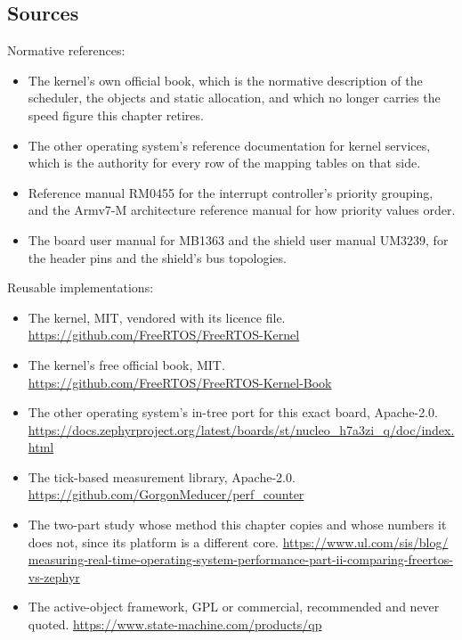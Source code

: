 \subsection*{Sources}

Normative references:
\begin{itemize}
\item The kernel's own official book, which is the normative description of the
scheduler, the objects and static allocation, and which no longer carries the
speed figure this chapter retires.
\item The other operating system's reference documentation for kernel services,
which is the authority for every row of the mapping tables on that side.
\item Reference manual RM0455 for the interrupt controller's priority grouping,
and the Armv7-M architecture reference manual for how priority values order.
\item The board user manual for MB1363 and the shield user manual UM3239, for
the header pins and the shield's bus topologies.
\end{itemize}

Reusable implementations:
\begin{itemize}
\item The kernel, MIT, vendored with its licence file.\newline
\url{https://github.com/FreeRTOS/FreeRTOS-Kernel}
\item The kernel's free official book, MIT.\newline
\url{https://github.com/FreeRTOS/FreeRTOS-Kernel-Book}
\item The other operating system's in-tree port for this exact board,
Apache-2.0.\newline
\url{https://docs.zephyrproject.org/latest/boards/st/nucleo_h7a3zi_q/doc/index.html}
\item The tick-based measurement library, Apache-2.0.\newline
\url{https://github.com/GorgonMeducer/perf_counter}
\item The two-part study whose method this chapter copies and whose numbers it
does not, since its platform is a different core.\newline
\url{https://www.ul.com/sis/blog/}\newline
\url{measuring-real-time-operating-system-performance-part-ii-comparing-freertos-vs-zephyr}
\item The active-object framework, GPL or commercial, recommended and never
quoted.\newline
\url{https://www.state-machine.com/products/qp}
\end{itemize}
